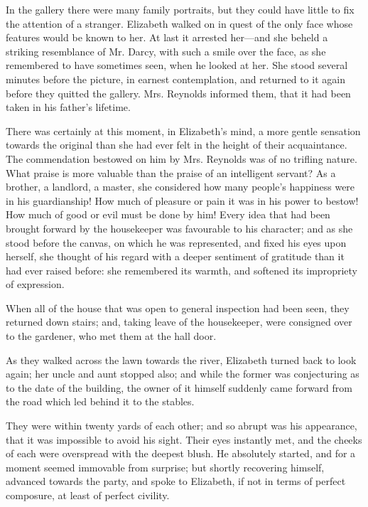In the gallery there were many family portraits, but they could have little to fix the attention of a stranger. Elizabeth walked on in quest of the only face whose features would be known to her. At last it arrested her---and she beheld a striking resemblance of Mr. Darcy, with such a smile over the face, as she remembered to have sometimes seen, when he looked at her. She stood several minutes before the picture, in earnest contemplation, and returned to it again before they quitted the gallery. Mrs. Reynolds informed them, that it had been taken in his father's lifetime.

There was certainly at this moment, in Elizabeth's mind, a more gentle sensation towards the original than she had ever felt in the height of their acquaintance. The commendation bestowed on him by Mrs. Reynolds was of no trifling nature. What praise is more valuable than the praise of an intelligent servant? As a brother, a landlord, a master, she considered how many people's happiness were in his guardianship! How much of pleasure or pain it was in his power to bestow! How much of good or evil must be done by him! Every idea that had been brought forward by the housekeeper was favourable to his character; and as she stood before the canvas, on which he was represented, and fixed his eyes upon herself, she thought of his regard with a deeper sentiment of gratitude than it had ever raised before: she remembered its warmth, and softened its impropriety of expression.

When all of the house that was open to general inspection had been seen, they returned down stairs; and, taking leave of the housekeeper, were consigned over to the gardener, who met them at the hall door.

As they walked across the lawn towards the river, Elizabeth turned back to look again; her uncle and aunt stopped also; and while the former was conjecturing as to the date of the building, the owner of it himself suddenly came forward from the road which led behind it to the stables.

They were within twenty yards of each other; and so abrupt was his appearance, that it was impossible to avoid his sight. Their eyes instantly met, and the cheeks of each were overspread with the deepest blush. He absolutely started, and for a moment seemed immovable from surprise; but shortly recovering himself, advanced towards the party, and spoke to Elizabeth, if not in terms of perfect composure, at least of perfect civility.

